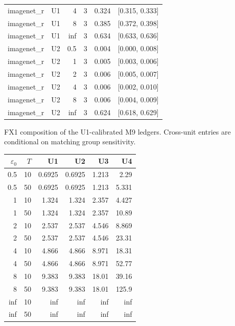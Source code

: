 \begin{tabular}{llrrrr}
imagenet\_r & U1 & 4 & 3 & 0.324 & [0.315, 0.333] \\
imagenet\_r & U1 & 8 & 3 & 0.385 & [0.372, 0.398] \\
imagenet\_r & U1 & inf & 3 & 0.634 & [0.633, 0.636] \\
imagenet\_r & U2 & 0.5 & 3 & 0.004 & [0.000, 0.008] \\
imagenet\_r & U2 & 1 & 3 & 0.005 & [0.003, 0.006] \\
imagenet\_r & U2 & 2 & 3 & 0.006 & [0.005, 0.007] \\
imagenet\_r & U2 & 4 & 3 & 0.006 & [0.002, 0.010] \\
imagenet\_r & U2 & 8 & 3 & 0.006 & [0.004, 0.009] \\
imagenet\_r & U2 & inf & 3 & 0.624 & [0.618, 0.629] \\
\bottomrule
\end{tabular}

\par\medskip
FX1 composition of the U1-calibrated M9 ledgers. Cross-unit entries are conditional on matching group sensitivity.
\par\begin{tabular}{rrrrrr}
\toprule
$\varepsilon_0$ & $T$ & U1 & U2 & U3 & U4 \\
\midrule
0.5 & 10 & 0.6925 & 0.6925 & 1.213 & 2.29 \\
0.5 & 50 & 0.6925 & 0.6925 & 1.213 & 5.331 \\
1 & 10 & 1.324 & 1.324 & 2.357 & 4.427 \\
1 & 50 & 1.324 & 1.324 & 2.357 & 10.89 \\
2 & 10 & 2.537 & 2.537 & 4.546 & 8.869 \\
2 & 50 & 2.537 & 2.537 & 4.546 & 23.31 \\
4 & 10 & 4.866 & 4.866 & 8.971 & 18.31 \\
4 & 50 & 4.866 & 4.866 & 8.971 & 52.77 \\
8 & 10 & 9.383 & 9.383 & 18.01 & 39.16 \\
8 & 50 & 9.383 & 9.383 & 18.01 & 125.9 \\
inf & 10 & inf & inf & inf & inf \\
inf & 50 & inf & inf & inf & inf \\
\bottomrule
\end{tabular}
